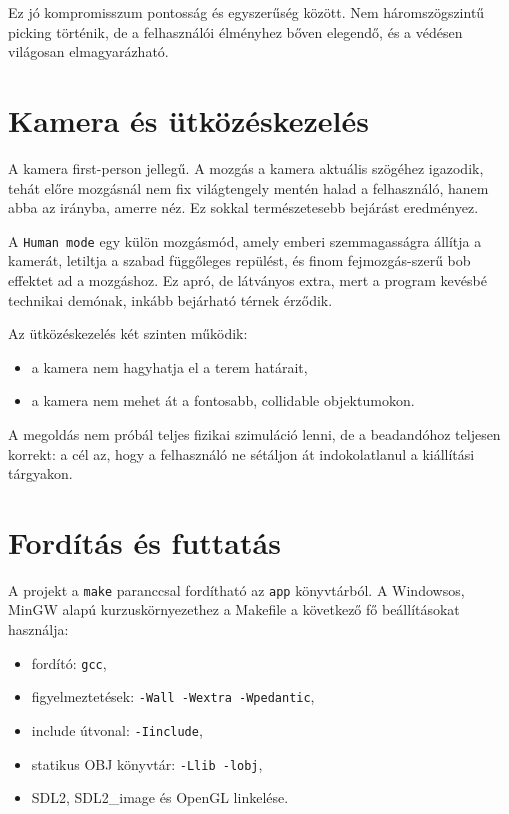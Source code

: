 \documentclass[12pt,a4paper]{article}
\newcommand{\code}[1]{\texttt{#1}}
\begin{document}
Ez jó kompromisszum pontosság és egyszerűség között. Nem háromszögszintű picking történik, de a felhasználói élményhez bőven elegendő, és a védésen világosan elmagyarázható.

\section{Kamera és ütközéskezelés}

A kamera first-person jellegű. A mozgás a kamera aktuális szögéhez igazodik, tehát előre mozgásnál nem fix világtengely mentén halad a felhasználó, hanem abba az irányba, amerre néz. Ez sokkal természetesebb bejárást eredményez.

A \code{Human mode} egy külön mozgásmód, amely emberi szemmagasságra állítja a kamerát, letiltja a szabad függőleges repülést, és finom fejmozgás-szerű bob effektet ad a mozgáshoz. Ez apró, de látványos extra, mert a program kevésbé technikai demónak, inkább bejárható térnek érződik.

Az ütközéskezelés két szinten működik:

\begin{itemize}
    \item a kamera nem hagyhatja el a terem határait,
    \item a kamera nem mehet át a fontosabb, collidable objektumokon.
\end{itemize}

A megoldás nem próbál teljes fizikai szimuláció lenni, de a beadandóhoz teljesen korrekt: a cél az, hogy a felhasználó ne sétáljon át indokolatlanul a kiállítási tárgyakon.

\section{Fordítás és futtatás}

A projekt a \code{make} paranccsal fordítható az \code{app} könyvtárból. A Windowsos, MinGW alapú kurzuskörnyezethez a Makefile a következő fő beállításokat használja:

\begin{itemize}
    \item fordító: \code{gcc},
    \item figyelmeztetések: \code{-Wall -Wextra -Wpedantic},
    \item include útvonal: \code{-Iinclude},
    \item statikus OBJ könyvtár: \code{-Llib -lobj},
    \item SDL2, SDL2\_image és OpenGL linkelése.
\end{itemize}
\end{document}

